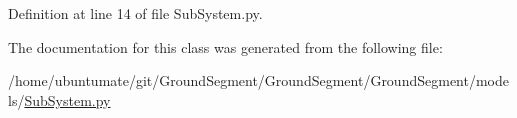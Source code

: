 Definition at line 14 of file Sub\+System.\+py.



The documentation for this class was generated from the following file\+:\begin{DoxyCompactItemize}
\item 
/home/ubuntumate/git/\+Ground\+Segment/\+Ground\+Segment/\+Ground\+Segment/models/\hyperlink{_sub_system_8py}{Sub\+System.\+py}\end{DoxyCompactItemize}
